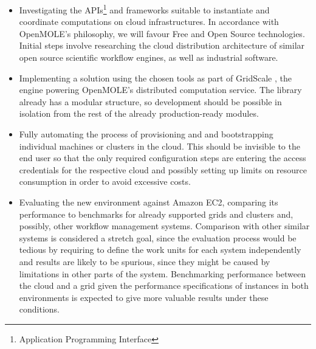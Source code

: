\begin{itemize}
	\item Investigating the APIs\footnote{Application Programming Interface} and frameworks suitable to instantiate and coordinate computations on cloud infrastructures. In accordance with OpenMOLE's philosophy, we will favour Free and Open Source technologies. Initial steps involve researching the cloud distribution architecture of similar open source scientific workflow engines, as well as industrial software.
	\item Implementing a solution using the chosen tools as part of GridScale \cite{Passerat2016}, the engine powering OpenMOLE's distributed computation service. The library already has a modular structure, so development should be possible in isolation from the rest of the already production-ready modules.
	\item Fully automating the process of provisioning and and bootstrapping individual machines or clusters in the cloud. This should be invisible to the end user so that the only required configuration steps are entering the access credentials for the respective cloud and possibly setting up limits on resource consumption in order to avoid excessive costs.
	\item Evaluating the new environment against Amazon EC2, comparing its performance to benchmarks for already supported grids and clusters and, possibly, other workflow management systems. Comparison with other similar systems is considered a stretch goal, since the evaluation process would be tedious by requiring to define the work units for each system independently and results are likely to be spurious, since they might be caused by limitations in other parts of the system. Benchmarking performance between the cloud and a grid given the performance specifications of instances in both environments is expected to give more valuable results under these conditions.
\end{itemize}